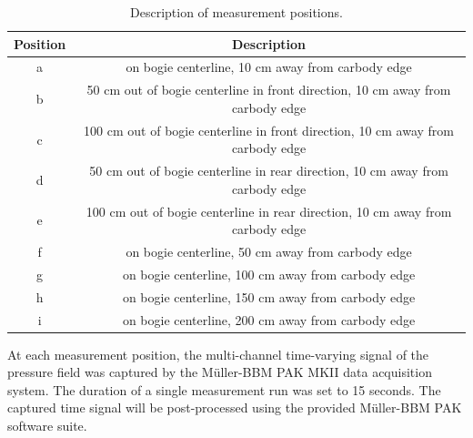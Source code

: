 \begin{table}[H]
	\begin{tabular}{cc}
		\toprule
		Position  & Description                                                                     \\
		\midrule
		a              & on bogie centerline, 10 cm away from carbody edge                              \\
		b              & 50 cm out of bogie centerline in front direction, 10 cm away from carbody edge  \\
		c              & 100 cm out of bogie centerline in front direction, 10 cm away from carbody edge \\
		d              & 50 cm out of bogie centerline in rear direction, 10 cm away from carbody edge   \\
		e              & 100 cm out of bogie centerline in rear direction, 10 cm away from carbody edge  \\
		f              & on bogie centerline, 50 cm away from carbody edge                              \\
		g              & on bogie centerline, 100 cm away from carbody edge                             \\
		h              & on bogie centerline, 150 cm away from carbody edge                             \\ 
		i              & on bogie centerline, 200 cm away from carbody edge                             \\ 
		\bottomrule
	\end{tabular}
	\caption{Description of measurement positions.}
	\label{tab:measurement_positons}
\end{table}
\noindent At each measurement position, the multi-channel time-varying signal of the pressure field was captured by the Müller-BBM PAK MKII data acquisition system. The duration of a single measurement run was set to 15 seconds. The captured time signal will be post-processed using the provided Müller-BBM PAK software suite.

